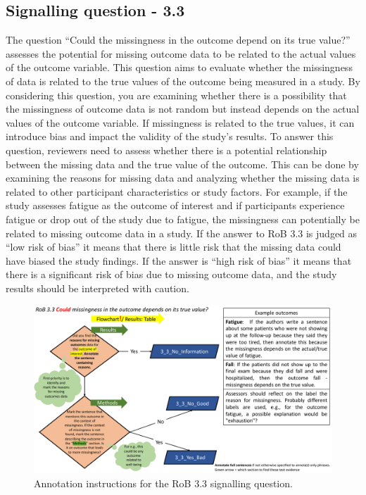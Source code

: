 \documentclass[sn-mathphys,Numbered]{sn-jnl}%
\begin{document}
\subsection*{Signalling question - 3.3 }
%
The question ``Could the missingness in the outcome depend on its true value?'' assesses the potential for missing outcome data to be related to the actual values of the outcome variable.
This question aims to evaluate whether the missingness of data is related to the true values of the outcome being measured in a study.
By considering this question, you are examining whether there is a possibility that the missingness of outcome data is not random but instead depends on the actual values of the outcome variable.
If missingness is related to the true values, it can introduce bias and impact the validity of the study's results.
To answer this question, reviewers need to assess whether there is a potential relationship between the missing data and the true value of the outcome.
This can be done by examining the reasons for missing data and analyzing whether the missing data is related to other participant characteristics or study factors.
For example, if the study assesses fatigue as the outcome of interest and if participants experience fatigue or drop out of the study due to fatigue, the missingness can potentially be related to missing outcome data in a study.
If the answer to RoB 3.3 is judged as ``low risk of bias'' it means that there is little risk that the missing data could have biased the study findings.
If the answer is ``high risk of bias'' it means that there is a significant risk of bias due to missing outcome data, and the study results should be interpreted with caution.


%
%
%
\begin{figure}[hbt]
    \centering
    \includegraphics[width=\textwidth]{figures/3_3.pdf}
    \caption{Annotation instructions for the RoB 3.3 signalling question.}
    \label{fig:3_3}
\end{figure}
%
\end{document}
